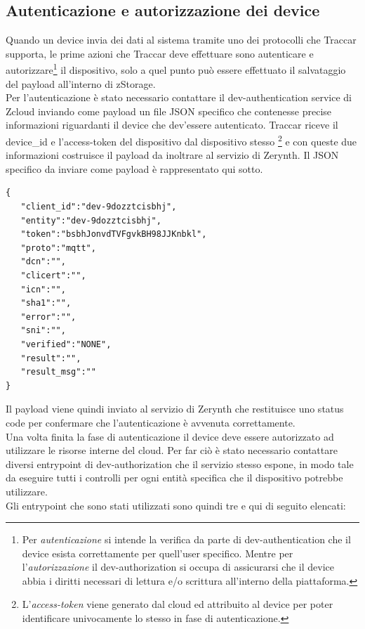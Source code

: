 \documentclass[a4paper,titlepage,12pt]{report}
\begin{document}
{\subsection{
Autenticazione e autorizzazione dei device}
Quando un device invia dei dati al sistema tramite uno dei protocolli che Traccar supporta, le prime azioni che Traccar deve effettuare sono autenticare e autorizzare\footnote{
Per \textit{autenticazione} si intende la verifica da parte di dev-authentication che il device esista correttamente per quell'user specifico. Mentre per l'\textit{autorizzazione} il dev-authorization si occupa di assicurarsi che il device abbia i diritti necessari di lettura e/o scrittura all'interno della piattaforma.} il dispositivo, solo a quel punto può essere effettuato il salvataggio del payload all'interno di zStorage.\\
Per l'autenticazione è stato necessario contattare il dev-authentication service di Zcloud inviando come payload un file JSON specifico che contenesse precise informazioni riguardanti il device che dev'essere autenticato. Traccar riceve il device\_id e l'access-token del dispositivo dal dispositivo stesso \footnote{
L'\textit{access-token} viene generato dal cloud ed attribuito al device per poter identificare univocamente lo stesso in fase di autenticazione.} e con queste due informazioni costruisce il payload da inoltrare al servizio di Zerynth. Il JSON specifico da inviare come payload è rappresentato qui sotto.
\newpage

\begin{verbatim}
{
   "client_id":"dev-9dozztcisbhj",
   "entity":"dev-9dozztcisbhj",
   "token":"bsbhJonvdTVFgvkBH98JJKnbkl",
   "proto":"mqtt",
   "dcn":"",
   "clicert":"",
   "icn":"",
   "sha1":"",
   "error":"",
   "sni":"",
   "verified":"NONE",
   "result":"",
   "result_msg":""
}

\end{verbatim}

\noindent Il payload viene quindi inviato al servizio di Zerynth che restituisce uno status code per confermare che l'autenticazione è avvenuta correttamente.\\
Una volta finita la fase di autenticazione il device deve essere autorizzato ad utilizzare le risorse interne del cloud. Per far ciò è stato necessario contattare diversi entrypoint di dev-authorization che il servizio stesso espone, in modo tale da eseguire tutti i controlli per ogni entità specifica che il dispositivo potrebbe utilizzare.
\\Gli entrypoint che sono stati utilizzati sono quindi tre e qui di seguito elencati:

}
\end{document}
